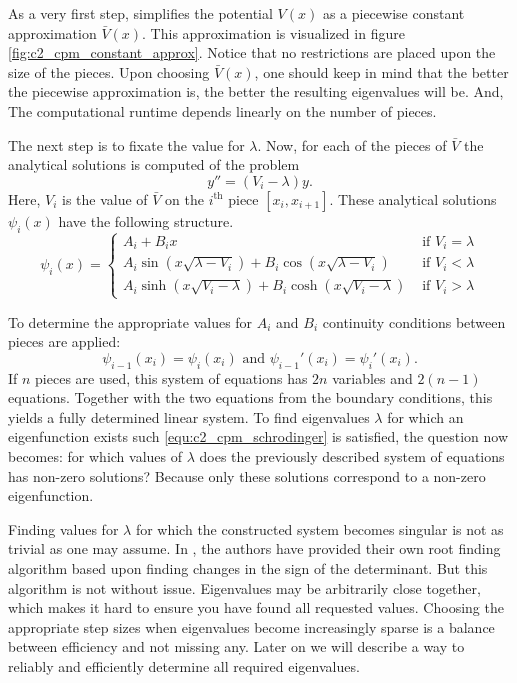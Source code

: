 As a very first step, \cite{canosa_new_1970} simplifies the potential $V(x)$ as a piecewise constant approximation $\bar{V}(x)$. This approximation is visualized in figure \ref{fig:c2_cpm_constant_approx}. Notice that no restrictions are placed upon the size of the pieces. Upon choosing $\bar{V}(x)$, one should keep in mind that the better the piecewise approximation is, the better the resulting eigenvalues will be. And, The computational runtime depends linearly on the number of pieces.

The next step is to fixate the value for $\lambda$. Now, for each of the pieces of $\bar{V}$ the analytical solutions is computed of the problem
$$
    y'' = (V_i - \lambda) y\text{.}
$$
Here, $V_i$ is the value of $\bar{V}$ on the $i^\text{th}$ piece $[x_i, x_{i+1}]$. These analytical solutions $\psi_i(x)$ have the following structure.
$$
    \psi_i(x) = \begin{cases}
        A_i + B_i x                                                         & \text{ if $V_i = \lambda$} \\
        A_i \sin(x\sqrt{\lambda - V_i}) + B_i \cos(x\sqrt{\lambda - V_i})   & \text{ if $V_i < \lambda$} \\
        A_i \sinh(x\sqrt{V_i - \lambda}) + B_i \cosh(x\sqrt{V_i - \lambda}) & \text{ if $V_i > \lambda$}
    \end{cases}
$$

To determine the appropriate values for $A_i$ and $B_i$ continuity conditions between pieces are applied:
$$
    \psi_{i-1}(x_i) = \psi_{i}(x_i) \text{ and } \psi_{i-1}'(x_i) = \psi_{i}'(x_i) \text{.}
$$
If $n$ pieces are used, this system of equations has $2n$ variables and $2(n-1)$ equations. Together with the two equations from the boundary conditions, this yields a fully determined linear system. To find eigenvalues $\lambda$ for which an eigenfunction exists such \eqref{equ:c2_cpm_schrodinger} is satisfied, the question now becomes: for which values of $\lambda$ does the previously described system of equations has non-zero solutions? Because only these solutions correspond to a non-zero eigenfunction.

Finding values for $\lambda$ for which the constructed system becomes singular is not as trivial as one may assume. In \cite{canosa_new_1970}, the authors have provided their own root finding algorithm based upon finding changes in the sign of the determinant. But this algorithm is not without issue. Eigenvalues may be arbitrarily close together, which makes it hard to ensure you have found all requested values. Choosing the appropriate step sizes when eigenvalues become increasingly sparse is a balance between efficiency and not missing any. Later on we will describe a way to reliably and efficiently determine all required eigenvalues.

